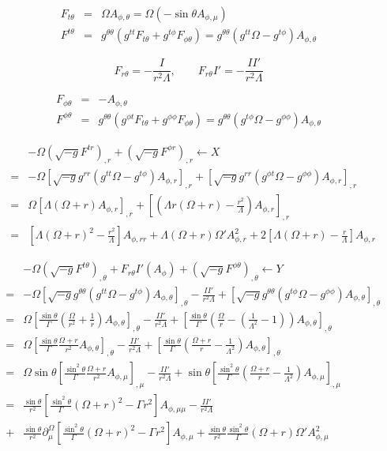 \documentclass[aps,prd,preprint,groupedaddress]{revtex4-1}
\def\nn{\nonumber}
\def\beq{\begin{equation}}
\def\beqn{\begin{eqnarray}}
\def\eeq{\end{equation}}
\def\eeqn{\end{eqnarray}}
\def\st{\sin\theta}
\def\sst{\sin^2\theta}
\def\Ar{A_{\phi,r}}
\def\Ah{A_{\phi,\theta}}
\def\Arr{A_{\phi,rr}}
\def\Am{A_{\phi,\mu}}
\def\Amm{A_{\phi,\mu\mu}}
\begin{document}
\beqn
F_{t \theta }
&=& \Omega A_{\phi,\theta} = \Omega (-\st \Am)\nn\\
F^{t\theta}
&=&g^{\theta\theta}(g^{tt}F_{t\theta}+g^{t\phi}F_{\phi \theta})
= g^{\theta\theta}(g^{tt}\Omega  -g^{t\phi}) \Ah
\eeqn

\beq
F_{r \theta} = -\frac{I}{r^2\Lambda}, \qquad F_{r \theta}I' = -\frac{II'}{r^2\Lambda}
\eeq

\beqn
F_{\phi \theta } &=& - \Ah\nn\\
F^{\phi \theta}
&=&g^{\theta\theta}(g^{\phi t}F_{t\theta}+g^{\phi \phi}F_{\phi \theta})
= g^{\theta\theta}(g^{t\phi}\Omega- g^{\phi\phi})\Ah
\eeqn

\beqn
&&-\Omega(\sqrt{-g}F^{tr})_{,r}+(\sqrt{-g}F^{\phi r})_{,r} \leftarrow X\nn\\
&=&-\Omega\left[\sqrt{-g}g^{rr} (g^{tt}\Omega - g^{t\phi} )\Ar \right]_{,r}
	+ \left[\sqrt{-g}g^{rr} (g^{\phi t}\Omega-g^{\phi\phi}) \Ar \right]_{,r}\nn\\
&=&\Omega\left[\Lambda (\Omega+r)\Ar \right]_{,r}
	+ \left[\left(\Lambda r(\Omega+r)-\frac{r^2}{\Lambda}\right) \Ar \right]_{,r}\nn\\
&=& \left[\Lambda(\Omega+r)^2-\frac{r^2}{\Lambda}\right] \Arr + \Lambda(\Omega+r)\Omega'\Ar^2
+2\left[\Lambda(\Omega +r) - \frac{r}{\Lambda}\right]\Ar
\eeqn

\beqn
&&-\Omega(\sqrt{-g}F^{t\theta})_{,\theta}+F_{r\theta}I'(A_\phi)
+(\sqrt{-g}F^{\phi\theta})_{,\theta} \leftarrow Y \nn\\
&=&
-\Omega\left[\sqrt{-g}g^{\theta\theta}(g^{tt}\Omega  -g^{t\phi}) \Ah\right]_{,\theta}-\frac{II'}{r^2\Lambda}+\left[\sqrt{-g}g^{\theta\theta}(g^{t\phi}\Omega- g^{\phi\phi})\Ah\right]_{,\theta}\nn\\
&=&
\Omega\left[\frac{\st}{\Gamma}(\frac{\Omega}{r^2}  + \frac{1}{r}) \Ah\right]_{,\theta}-\frac{II'}{r^2\Lambda}+\left[\frac{\st}{\Gamma} \left(\frac{\Omega}{r}-(\frac{1}{\Lambda^2}-1)\right)\Ah\right]_{,\theta}\nn\\
&=&
\Omega\left[\frac{\st}{\Gamma}\frac{\Omega+r}{r^2} \Ah\right]_{,\theta}-\frac{II'}{r^2\Lambda}
+\left[\frac{\st}{\Gamma} \left(\frac{\Omega+r}{r}-\frac{1}{\Lambda^2}\right)\Ah\right]_{,\theta}\nn\\
&=&
\Omega\st\left[\frac{\sst}{\Gamma}\frac{\Omega+r}{r^2} \Am\right]_{,\mu}-\frac{II'}{r^2\Lambda}
+\st \left[\frac{\sst}{\Gamma} \left(\frac{\Omega+r}{r}-\frac{1}{\Lambda^2}\right)\Am\right]_{,\mu}\nn\\
&=&
\frac{\st}{r^2} \left[\frac{\sst}{\Gamma}(\Omega+r)^2-\Gamma r^2\right]\Amm-\frac{II'}{r^2\Lambda} \nn \\
&+&
\frac{\st}{r^2}\partial_\mu^\Omega \left[\frac{\sst}{\Gamma}(\Omega+r)^2-\Gamma r^2\right]\Am
+ \frac{\st}{r^2} \frac{\sst}{\Gamma} (\Omega+r) \Omega' \Am^2
\eeqn
\end{document}
